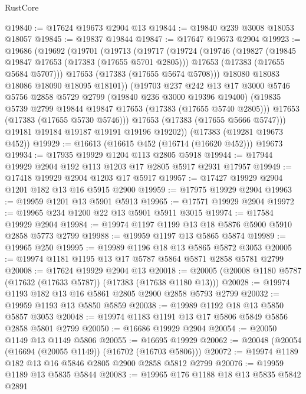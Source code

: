 \begin{lexlean}{RustCore}
\begin{coremodule}
@19840 := @17624 @19673 @2904 @13
@19844 := @19840 @239 @3008 @18053 @18057
@19845 := @19837 @19844
@19847 := @17647 @19673 @2904
@19923 := @19686
    (@19692
      (@19701
        (@19713
          (@19717
            (@19724
              (@19746
                (@19827
                  (@19845 @19847 @17653 (@17383 (@17655 @5701 @2805)))
                  @17653
                  (@17383 (@17655 @5684 @5707)))
                @17653
                (@17383 (@17655 @5674 @5708)))
              @18080
              @18083
              @18086
              @18090
              @18095
              @18101))
          (@19703
            @237
            @242
            @13
            @17
            @3000
            @5746
            @5756
            @2858
            @5729
            @2799
            (@19840 @236 @3000 @19396 @19400)
            (@19835 @5739 @2799 @19844 @19847 @17653 (@17383 (@17655 @5740 @2805)))
            @17653
            (@17383 (@17655 @5730 @5746)))
          @17653
          (@17383 (@17655 @5666 @5747)))
        @19181
        @19184
        @19187
        @19191
        @19196
        @19202))
    (@17383 (@19281 @19673 @452))
@19929 := @16613 (@16615 @452 (@16714 (@16620 @452))) @19673
@19934 := @17935 @19929 @1204 @113 @2805 @5918
@19944 := @17944 @19929 @2904 @192 @113 @1203 @17 @2805 @5917 @2931 @17957
@19949 := @17418 @19929 @2904 @1203 @17 @5917
@19957 := @17427 @19929 @2904 @1201 @182 @13 @16 @5915 @2900
@19959 := @17975 @19929 @2904
@19963 := @19959 @1201 @13 @5901 @5913
@19965 := @17571 @19929 @2904
@19972 := @19965 @234 @1200 @22 @13 @5901 @5911 @3015
@19974 := @17584 @19929 @2904
@19984 := @19974 @1197 @1199 @13 @18 @5876 @5900 @5910 @2858 @5773 @2799
@19988 := @19959 @1197 @13 @5865 @5874
@19989 := @19965 @250
@19995 := @19989 @1196 @18 @13 @5865 @5872 @3053
@20005 := @19974 @1181 @1195 @13 @17 @5787 @5864 @5871 @2858 @5781 @2799
@20008 := @17624 @19929 @2904 @13
@20018 := @20005 (@20008 @1180 @5787 (@17632 (@17633 @5787)) (@17383 (@17638 @1180 @13)))
@20028 := @19974 @1193 @182 @13 @16 @5861 @2805 @2900 @2858 @5793 @2799
@20032 := @19959 @1193 @13 @5850 @5859
@20038 := @19989 @1192 @18 @13 @5850 @5857 @3053
@20048 := @19974 @1183 @1191 @13 @17 @5806 @5849 @5856 @2858 @5801 @2799
@20050 := @16686 @19929 @2904
@20054 := @20050 @1149 @13 @1149 @5806
@20055 := @16695 @19929
@20062 := @20048 (@20054 (@16694 (@20055 @1149)) (@16702 (@16703 @5806)))
@20072 := @19974 @1189 @182 @13 @16 @5846 @2805 @2900 @2858 @5812 @2799
@20076 := @19959 @1189 @13 @5835 @5844
@20083 := @19965 @176 @1188 @18 @13 @5835 @5842 @2891

\end{coremodule}
\end{lexlean}
